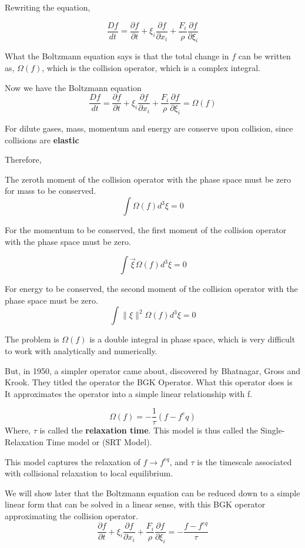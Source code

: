 \documentclass{article}
\begin{document}
Rewriting the equation,

\[
	\frac{Df}{dt} = \frac{\partial f}{\partial t} + \xi_i \frac{\partial f}{\partial x_i} + \frac{F_i}{\rho} \frac{\partial f}{\partial \xi_i}
\]

What the Boltzmann equation says is that the total change in $f$ can be written as, $\Omega(f)$, which is the collision operator, which is a complex integral.

Now we have the Boltzmann equation
\[
	\frac{Df}{dt} = \frac{\partial f}{\partial t} + \xi_i \frac{\partial f}{\partial x_i} + \frac{F_i}{\rho} \frac{\partial f}{\partial \xi_i} = \Omega(f)
\]

For dilute gases, mass, momentum and energy are conserve upon collision, since collisions are \textbf{elastic}

Therefore, 

The zeroth moment of the collision operator with the phase space must be zero for mass to be conserved.
\[ 
	\int \Omega(f) d^3 \xi = 0
\]

For the momentum to be conserved, the first moment of the collision operator with the phase space must be zero. 

\[ 
\int \vec{\xi} \Omega(f) d^3 \xi = 0
\]

For energy to be conserved, the second moment of the collision operator with the phase space must be zero.  
\[
	\int \| \xi \|^2 \Omega(f) d^3 \xi = 0
\]

The problem is $\Omega(f)$ is a double integral in phase space, which is very difficult to work with analytically and numerically.

But, in 1950, a simpler operator came about, discovered by Bhatnagar, Gross and Krook. They titled the operator the BGK Operator. What this operator does is It approximates the operator into a simple linear relationship with f.

\[ 
	\Omega(f) = - \frac{1}{\tau} (f - f^eq)
\]
Where, $\tau$ is called the \textbf{relaxation time}. This model is thus called the Single-Relaxation Time model or (SRT Model).

This model captures the relaxation of $f \rightarrow f^{eq}$, and $\tau$ is the timescale associated with collisional relaxation to local equilibrium.

We will show later that the Boltzmann equation can be reduced down to a simple linear form that can be solved in a linear sense, with this BGK operator approximating the collision operator.
\[
	\frac{\partial f}{\partial t} + \xi_i \frac{\partial f}{\partial x_i} + \frac{F_i}{\rho} \frac{\partial f}{\partial \xi_i} = -\frac{f - f^{eq}}{\tau}
\]
\end{document}
